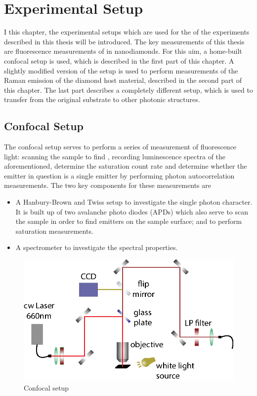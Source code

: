 
\chapter{Experimental Setup}	\label{ch::experimental_setup}

	I this chapter, the experimental setups which are used for the of the experiments described in this thesis will be introduced. 
	The key measurements of this thesis are fluorescence measurements of \sivs in nanodiamonds.
	For this aim, a home-built confocal setup is used, which is described in the first part of this chapter.
	A slightly modified version of the setup is used to perform measurements of the Raman emission of the diamond host material, described in the second part of this chapter.
	The last part describes a completely different setup, which is used to transfer \nds from the original substrate to other photonic structures.




	\section{Confocal Setup}

	The confocal setup serves to perform a series of measurement of fluorescence light: scanning the sample to find \sivs, recording luminescence spectra of the aforementioned, determine the saturation count rate and determine whether the emitter in question is a single emitter by performing photon autocorrelation measurements.
	The two key components for these measurements are 

	\begin{itemize}
		\item A Hanbury-Brown and Twiss setup to investigate the single photon character. It is built up of two avalanche photo diodes (APDs) which also serve to scan the sample in order to find emitters on the sample surface; and to perform saturation measurements.
		\item A spectrometer to investigate the spectral properties.
	\end{itemize}


	\begin{figure}[t] %
		\centering
		\includegraphics[width=\linewidth]{./pics/confocal_setup.eps}
		\caption{Confocal setup}
		\label{fig::confocal_setup}
	\end{figure}

